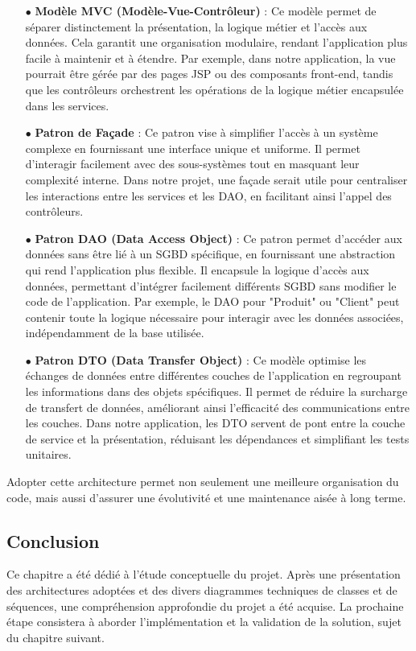 \begin{itemize}
    \item[$\bullet$] \textbf{Modèle MVC (Modèle-Vue-Contrôleur)} : Ce modèle permet de séparer distinctement la présentation, la logique métier et l'accès aux données. Cela garantit une organisation modulaire, rendant l'application plus facile à maintenir et à étendre. Par exemple, dans notre application, la vue pourrait être gérée par des pages JSP ou des composants front-end, tandis que les contrôleurs orchestrent les opérations de la logique métier encapsulée dans les services.

    \item[$\bullet$] \textbf{Patron de Façade} : Ce patron vise à simplifier l'accès à un système complexe en fournissant une interface unique et uniforme. Il permet d'interagir facilement avec des sous-systèmes tout en masquant leur complexité interne. Dans notre projet, une façade serait utile pour centraliser les interactions entre les services et les DAO, en facilitant ainsi l'appel des contrôleurs.

    \item[$\bullet$] \textbf{Patron DAO (Data Access Object)} : Ce patron permet d'accéder aux données sans être lié à un SGBD spécifique, en fournissant une abstraction qui rend l'application plus flexible. Il encapsule la logique d'accès aux données, permettant d'intégrer facilement différents SGBD sans modifier le code de l'application. Par exemple, le DAO pour "Produit" ou "Client" peut contenir toute la logique nécessaire pour interagir avec les données associées, indépendamment de la base utilisée.

    \item[$\bullet$] \textbf{Patron DTO (Data Transfer Object)} : Ce modèle optimise les échanges de données entre différentes couches de l'application en regroupant les informations dans des objets spécifiques. Il permet de réduire la surcharge de transfert de données, améliorant ainsi l'efficacité des communications entre les couches. Dans notre application, les DTO servent de pont entre la couche de service et la présentation, réduisant les dépendances et simplifiant les tests unitaires.
\end{itemize}

Adopter cette architecture permet non seulement une meilleure organisation du code, mais aussi d'assurer une évolutivité et une maintenance aisée à long terme.


\subsection*{Conclusion}

Ce chapitre a été dédié à l’étude conceptuelle du projet. Après une présentation des architectures adoptées et des divers diagrammes techniques de classes et de séquences, une compréhension approfondie du projet a été acquise. La prochaine étape consistera à aborder l’implémentation et la validation de la solution, sujet du chapitre suivant.
\pagebreak
